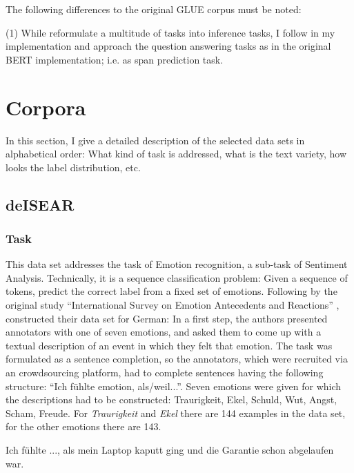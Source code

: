 The following differences to the original GLUE corpus must be noted:

(1) While \cite{wang2018glue} reformulate a multitude of tasks into inference tasks, I follow in my implementation \cite{zhang2019semantics} and approach the question answering tasks as \cite{devlin2018bert} in the original BERT implementation; i.e. as span prediction task.

\section{Corpora}

In this section, I give a detailed description of the selected data sets in alphabetical order:
What kind of task is addressed, what is the text variety, how looks the label distribution, etc.

\subsection{deISEAR}

\subsubsection{Task}

This data set addresses the task of Emotion recognition, a sub-task of Sentiment Analysis.
Technically, it is a sequence classification problem: Given a sequence of tokens, predict the correct label from a fixed set of emotions.
Following by the original study ``International Survey on Emotion Antecedents and Reactions'' \citep{scherer1994evidence}, \cite{troiano2019crowdsourcing} constructed their data set for German:
In a first step, the authors presented annotators with one of seven emotions, and asked them to come up with a textual description of an event in which they felt that emotion.
The task was formulated as a sentence completion, so the annotators, which were recruited via an crowdsourcing platform, had to complete sentences having the following structure: ``Ich fühlte {emotion}, als/weil...''.
Seven emotions were given for which the descriptions had to be constructed:
Traurigkeit, Ekel, Schuld, Wut, Angst, Scham, Freude.
For \emph{Traurigkeit} and \emph{Ekel} there are 144 examples in the data set, for the other emotions there are 143.

\begin{examples}
	\label{ex:deisear}
	\item Ich fühlte ..., als mein Laptop kaputt ging und die Garantie schon abgelaufen war.
\end{examples}


